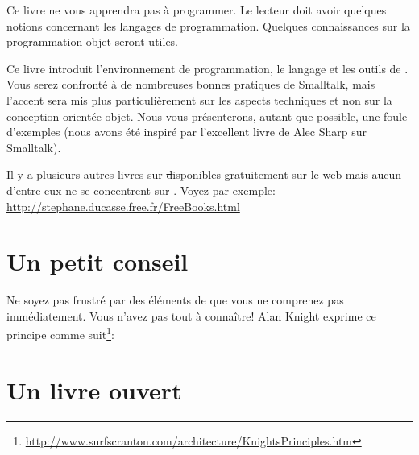 \documentclass[a4paper,10pt,twoside]{book}
\begin{document}
Ce livre ne vous apprendra pas \`a programmer. Le lecteur doit avoir quelques notions concernant les langages de programmation. Quelques connaissances sur la programmation objet seront utiles.

Ce livre introduit l'environnement de programmation, le langage et
les outils de \pharo. Vous serez confront\'e \`a de nombreuses bonnes
pratiques de Smalltalk, mais l'accent sera mis plus particuli\`erement
sur les aspects techniques et non sur la conception orient\'ee
objet. Nous vous pr\'esenterons, autant que possible, une foule 
d'exemples (nous avons \'et\'e inspir\'e par l'excellent livre de Alec
Sharp sur Smalltalk\cite{Shar97a}).

Il y a plusieurs autres livres sur \st disponibles gratuitement sur le web mais aucun d'entre eux ne se concentrent sur \pharo. Voyez par exemple:
\url{http://stephane.ducasse.free.fr/FreeBooks.html}

\ifluluelse{}{\newpage} %
\section*{Un petit conseil}


Ne soyez pas frustr\'e par des \'el\'ements de \st que vous ne comprenez pas imm\'ediatement.
Vous n'avez pas tout \`a conna\^itre!
Alan Knight exprime ce principe comme suit\footnote{\url{http://www.surfscranton.com/architecture/KnightsPrinciples.htm}}:
\important{{\bf Ne vous en pr\'eoccupez pas!}%
\footnote{Dans sa version originale: ``Try not to care''.}
Les d\'eveloppeurs \st d\'ebutants ont souvent beaucoup de
difficult\'es car ils pensent qu'il est n\'ecessaire de conna\^itre
tous les d\'etails d'une chose avant de l'utiliser. Cela signifie
qu'il leur faut un moment avant de ma\^{\i}triser un simple: \ct{Transcript show: 'Hello World'}. Une des grandes avanc\'ees de la programmation par objets est de pouvoir r\'epondre \`a la question ``Comment ceci marche?'' avec  ``Je ne m'en pr\'eoccupe pas''.}

\section*{Un livre ouvert}
\end{document}
